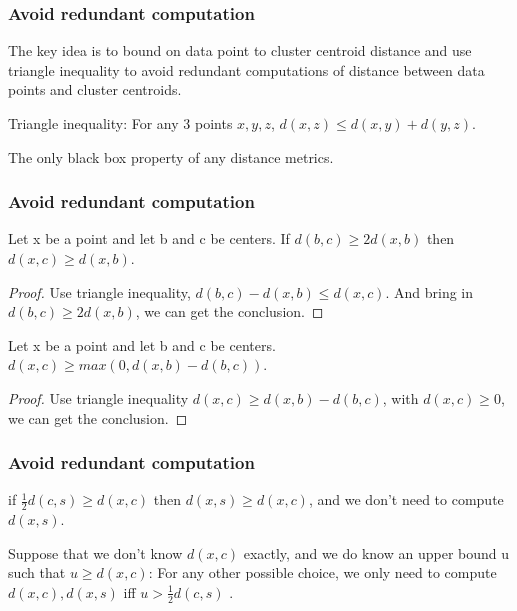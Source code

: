 \documentclass[9pt]{beamer}
\newcommand{\ccp}[1]{{\color{purple}#1}}
\begin{document}
\begin{frame}
	\frametitle{Avoid redundant computation}
	The key idea is to \ccp{bound on data point} to cluster centroid distance and use \ccp{triangle inequality} to avoid redundant computations of distance between data points and cluster centroids.
	\begin{lemma}
	Triangle inequality: For any 3 points $x, y, z$, $d(x,z) \le d(x, y) + d(y, z)$.
	\end{lemma} 
The only black box property of any distance metrics.
\end{frame}

\begin{frame}
	\frametitle{Avoid redundant computation}
	\begin{lemma}
Let x be a point and let b and c be centers. If $d(b, c) \ge 2d(x,b)$ then $d(x,c) \ge d(x,b)$.
\end{lemma}
\begin{proof}
Use triangle inequality, $d(b,c) - d(x,b)\le d(x,c)$. And bring in $d(b, c) \ge 2d(x,b)$, we can get the conclusion.
\end{proof}
\pause
\begin{lemma}
Let x be a point and let b and c be centers. $d(x,c) \ge max(0, d(x,b)-d(b,c))$.
\end{lemma}
\begin{proof}
Use triangle inequality $d(x,c) \ge d(x,b)-d(b,c)$, with $d(x,c) \ge 0$, we can get the conclusion.
\end{proof}
\end{frame}

\begin{frame}
\frametitle{Avoid redundant computation}
	\begin{corollary}
if $\frac{1}{2}d(c, s) \ge d(x,c)$ then $d(x, s) \ge d(x, c)$, and we \ccp{don't need to compute $d(x,s)$.} 
\end{corollary}
\pause
\begin{corollary}
Suppose that we don't know $d(x,c)$ exactly, and we do know an upper bound u such that $u \ge d(x,c)$: For any other possible choice, \ccp{we only need to compute $d(x, c), d(x, s)$ iff $u > \frac{1}{2}d(c, s)$ .}
\end{corollary}

\end{frame}
\end{document}
